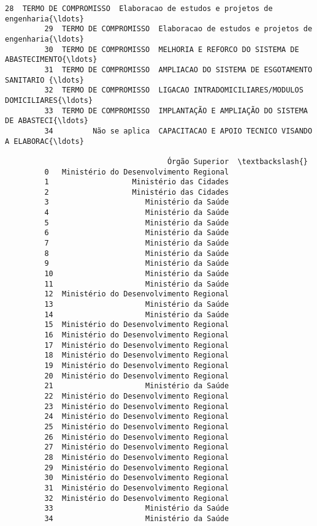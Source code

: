 \documentclass[11pt]{article}
\begin{document}
\begin{Verbatim}[commandchars=\\\{\}]
         28  TERMO DE COMPROMISSO  Elaboracao de estudos e projetos de engenharia{\ldots}   
         29  TERMO DE COMPROMISSO  Elaboracao de estudos e projetos de engenharia{\ldots}   
         30  TERMO DE COMPROMISSO  MELHORIA E REFORCO DO SISTEMA DE ABASTECIMENTO{\ldots}   
         31  TERMO DE COMPROMISSO  AMPLIACAO DO SISTEMA DE ESGOTAMENTO SANITARIO {\ldots}   
         32  TERMO DE COMPROMISSO  LIGACAO INTRADOMICILIARES/MODULOS DOMICILIARES{\ldots}   
         33  TERMO DE COMPROMISSO  IMPLANTAÇÃO E AMPLIAÇÃO DO SISTEMA DE ABASTECI{\ldots}   
         34         Não se aplica  CAPACITACAO E APOIO TECNICO VISANDO A ELABORAC{\ldots}   
         
                                     Órgão Superior  \textbackslash{}
         0   Ministério do Desenvolvimento Regional   
         1                   Ministério das Cidades   
         2                   Ministério das Cidades   
         3                      Ministério da Saúde   
         4                      Ministério da Saúde   
         5                      Ministério da Saúde   
         6                      Ministério da Saúde   
         7                      Ministério da Saúde   
         8                      Ministério da Saúde   
         9                      Ministério da Saúde   
         10                     Ministério da Saúde   
         11                     Ministério da Saúde   
         12  Ministério do Desenvolvimento Regional   
         13                     Ministério da Saúde   
         14                     Ministério da Saúde   
         15  Ministério do Desenvolvimento Regional   
         16  Ministério do Desenvolvimento Regional   
         17  Ministério do Desenvolvimento Regional   
         18  Ministério do Desenvolvimento Regional   
         19  Ministério do Desenvolvimento Regional   
         20  Ministério do Desenvolvimento Regional   
         21                     Ministério da Saúde   
         22  Ministério do Desenvolvimento Regional   
         23  Ministério do Desenvolvimento Regional   
         24  Ministério do Desenvolvimento Regional   
         25  Ministério do Desenvolvimento Regional   
         26  Ministério do Desenvolvimento Regional   
         27  Ministério do Desenvolvimento Regional   
         28  Ministério do Desenvolvimento Regional   
         29  Ministério do Desenvolvimento Regional   
         30  Ministério do Desenvolvimento Regional   
         31  Ministério do Desenvolvimento Regional   
         32  Ministério do Desenvolvimento Regional   
         33                     Ministério da Saúde   
         34                     Ministério da Saúde   
         

\end{Verbatim}
\end{document}
